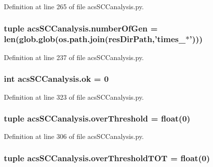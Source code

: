 Definition at line 265 of file acs\+S\+C\+Canalysis.\+py.

\hypertarget{a00130_a9a81829f850e2e125e3c94214da7a1f0}{
\subsubsection[{number\+Of\+Gen}]{\setlength{\rightskip}{0pt plus 5cm}tuple acs\+S\+C\+Canalysis.\+number\+Of\+Gen = len(glob.\+glob(os.\+path.\+join({\bf res\+Dir\+Path},'times\+\_\+$\ast$')))}}\label{a00130_a9a81829f850e2e125e3c94214da7a1f0}


Definition at line 237 of file acs\+S\+C\+Canalysis.\+py.

\hypertarget{a00130_a9ce833d782f17d858941cfa76914599a}{
\subsubsection[{ok}]{\setlength{\rightskip}{0pt plus 5cm}int acs\+S\+C\+Canalysis.\+ok = 0}}\label{a00130_a9ce833d782f17d858941cfa76914599a}


Definition at line 323 of file acs\+S\+C\+Canalysis.\+py.

\hypertarget{a00130_a12e61f8d7aadb52256a7728af342bae3}{
\subsubsection[{over\+Threshold}]{\setlength{\rightskip}{0pt plus 5cm}tuple acs\+S\+C\+Canalysis.\+over\+Threshold = float(0)}}\label{a00130_a12e61f8d7aadb52256a7728af342bae3}


Definition at line 306 of file acs\+S\+C\+Canalysis.\+py.

\hypertarget{a00130_a93de20dd9ebf791127ac5aefc0a2df8d}{
\subsubsection[{over\+Threshold\+T\+O\+T}]{\setlength{\rightskip}{0pt plus 5cm}tuple acs\+S\+C\+Canalysis.\+over\+Threshold\+T\+O\+T = float(0)}}\label{a00130_a93de20dd9ebf791127ac5aefc0a2df8d}


